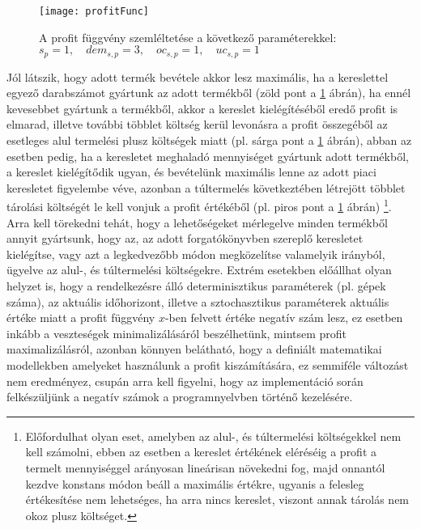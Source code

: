 \begin{figure}
\begin{center}
\texttt{[image: profitFunc]}
\caption[A profit függvény szemléltetése a következő paraméterekkel:; $s_p=1,\quad dem_{s,p}=3, \quad oc_{s,p}=1, \quad  uc_{s,p}=1$]
    {A profit függvény szemléltetése a következő paraméterekkel: \\ $s_p=1,\quad dem_{s,p}=3, \quad oc_{s,p}=1, \quad  uc_{s,p}=1$\endtabular}
\label{profit_func}
\end{center}
\end{figure}
Jól látszik, hogy adott termék bevétele akkor lesz maximális, ha a kereslettel egyező darabszámot gyártunk az adott termékből (zöld pont a \ref{profit_func} ábrán), ha ennél kevesebbet gyártunk a termékből, akkor a kereslet kielégítéséből eredő profit is elmarad, illetve további többlet költség kerül levonásra a profit összegéből az esetleges alul termelési plusz költségek miatt (pl. sárga pont a \ref{profit_func} ábrán), abban az esetben pedig, ha a keresletet meghaladó mennyiséget gyártunk adott termékből, a kereslet kielégítődik ugyan, és bevételünk maximális lenne az adott piaci keresletet figyelembe véve, azonban a túltermelés következtében létrejött többlet tárolási költségét le kell vonjuk a profit értékéből (pl. piros pont a \ref{profit_func} ábrán) \footnote{Előfordulhat olyan eset, amelyben az alul-, és túltermelési költségekkel nem kell számolni, ebben az esetben a kereslet értékének eléréséig a profit a termelt mennyiséggel arányosan lineárisan növekedni fog, majd onnantól kezdve konstans módon beáll a maximális értékre, ugyanis a felesleg értékesítése nem lehetséges, ha arra nincs kereslet, viszont annak tárolás nem okoz plusz költséget.}.
Arra kell törekedni tehát, hogy a lehetőségeket mérlegelve minden termékből annyit gyártsunk, hogy az, az adott forgatókönyvben szereplő keresletet kielégítse, vagy azt a legkedvezőbb módon megközelítse valamelyik irányból, ügyelve az alul-, és túltermelési költségekre.
Extrém esetekben előállhat olyan helyzet is, hogy a rendelkezésre álló determinisztikus paraméterek (pl. gépek száma), az aktuális időhorizont, illetve a sztochasztikus paraméterek aktuális értéke miatt a profit függvény $x$-ben felvett értéke negatív szám lesz, ez esetben inkább a veszteségek minimalizálásáról beszélhetünk, mintsem profit maximalizálásról, azonban könnyen belátható, hogy a definiált matematikai modellekben amelyeket használunk a profit kiszámítására, ez semmiféle változást nem eredményez, csupán arra kell figyelni, hogy az implementáció során felkészüljünk a negatív számok a programnyelvben történő kezelésére.